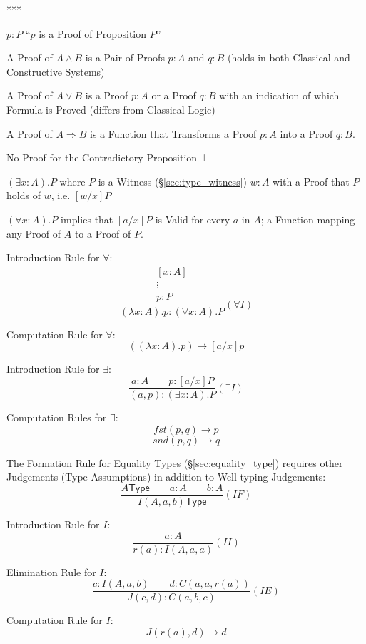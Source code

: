 ***

$p : P$ ``$p$ is a Proof of Proposition $P$''

A Proof of $A \wedge B$ is a Pair of Proofs $p : A$ and $q : B$ (holds
in both Classical and Constructive Systems)

A Proof of $A \vee B$ is a Proof $p : A$ or a Proof $q : B$ with an
indication of which Formula is Proved (differs from Classical Logic)

A Proof of $A \Rightarrow B$ is a Function that Transforms a Proof $p
: A$ into a Proof $q : B$.

No Proof for the Contradictory Proposition $\bot$

$(\exists x : A).P$ where $P$ is a Witness (\S\ref{sec:type_witness})
$w : A$ with a Proof that $P$ holds of $w$, i.e. $[w/x]P$

$(\forall x : A).P$ implies that $[a/x]P$ is Valid for every $a$ in
$A$; a Function mapping any Proof of $A$ to a Proof of $P$.

Introduction Rule for $\forall$:
\[
  {
    \frac{
      \begin{matrix}
        [x : A]\\
        \vdots\\
        p : P
      \end{matrix}
    }{
      (\lambda x : A).p : (\forall x : A).P
    }
  } (\forall I)
\]

Computation Rule for $\forall$:
\[
  ((\lambda x : A).p) \rightarrow [a/x]p
\]

Introduction Rule for $\exists$:
\[
  {
    \frac{
      a : A \quad\quad p : [a/x]P
    }{
      (a,p) : (\exists x : A).P
    }
  } (\exists I)
\]

Computation Rules for $\exists$:
\[
  fst (p,q) \rightarrow p
\]\[
  snd (p,q) \rightarrow q
\]

The Formation Rule for Equality Types (\S\ref{sec:equality_type})
requires other Judgements (Type Assumptions) in addition to
Well-typing Judgements:
\[
  {
    \frac{ A \mathsf{ Type} \quad\quad a : A \quad\quad b:A }
    { I (A,a,b) \mathsf{ Type}}
  } (I F)
\]

Introduction Rule for $I$:
\[
  {
    \frac{ a : A }
    { r(a) : I(A,a,a)}
  } (II)
\]

Elimination Rule for $I$:
\[
  {
    \frac{ c : I (A, a, b) \quad\quad d : C(a,a,r(a)) }
    { J(c,d) : C(a,b,c) }
  } (I E)
\]

Computation Rule for $I$:
\[
  J (r(a), d) \rightarrow d
\]

